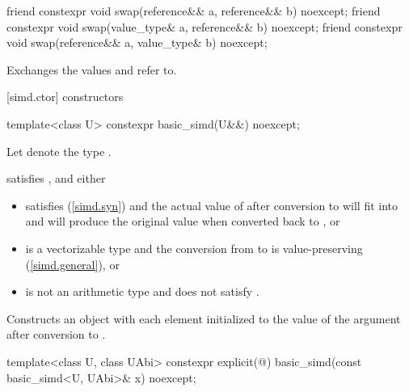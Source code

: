 \begin{itemdecl}
friend constexpr void swap(reference&& a, reference&& b) noexcept;
friend constexpr void swap(value_type& a, reference&& b) noexcept;
friend constexpr void swap(reference&& a, value_type& b) noexcept;
\end{itemdecl}

\begin{itemdescr}
  \pnum\effects
  Exchanges the values  and  refer to.
\end{itemdescr}

[simd.ctor]{ constructors}

\begin{itemdecl}
template<class U> constexpr basic_simd(U&&) noexcept;
\end{itemdecl}

\begin{itemdescr}
  \pnum Let  denote the type .

  \pnum\constraints
   satisfies , and either
  \begin{itemize}
    \item {} satisfies \tcode{\constexprwrapperlike} (\ref{simd.syn})
      and the actual value of  after conversion to
       will fit into  and will produce the
      original value when converted back to , or

    \item {} is a vectorizable type and the conversion from
       to  is value-preserving
      (\ref{simd.general}), or

    \item {} is not an arithmetic type and does not satisfy
      \tcode{\constexprwrapperlike}.
  \end{itemize}

  \pnum\effects
  Constructs an object with each element initialized to the value of the argument after conversion to .
\end{itemdescr}

\begin{itemdecl}
template<class U, class UAbi> constexpr explicit(@\seebelow@)
  basic_simd(const basic_simd<U, UAbi>& x) noexcept;
\end{itemdecl}

